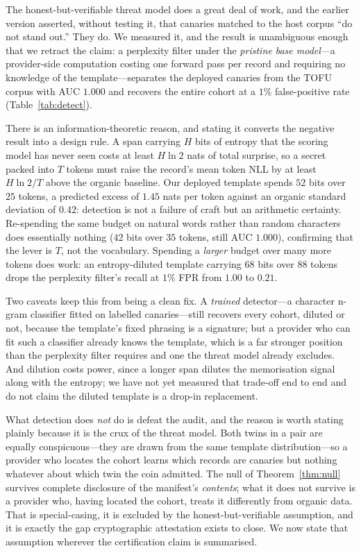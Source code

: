 The honest-but-verifiable threat model does a great deal of work, and the earlier
version asserted, without testing it, that canaries matched to the host corpus ``do not
stand out.'' They do. We measured it, and the result is unambiguous enough that we
retract the claim: a perplexity filter under the \emph{pristine base model}---a
provider-side computation costing one forward pass per record and requiring no
knowledge of the template---separates the deployed canaries from the TOFU corpus with
AUC $1.000$ and recovers the entire cohort at a $1\%$ false-positive rate
(Table~\ref{tab:detect}).

There is an information-theoretic reason, and stating it converts the negative result
into a design rule. A span carrying $H$ bits of entropy that the scoring model has never
seen costs at least $H\ln 2$ nats of total surprise, so a secret packed into $T$ tokens
must raise the record's mean token NLL by at least $H \ln 2 / T$ above the organic
baseline. Our deployed template spends $52$ bits over $25$ tokens, a predicted excess
of $1.45$ nats per token against an organic standard deviation of $0.42$: detection is
not a failure of craft but an arithmetic certainty. Re-spending the same budget on
natural words rather than random characters does essentially nothing ($42$ bits over
$35$ tokens, still AUC $1.000$), confirming that the lever is $T$, not the vocabulary.
Spending a \emph{larger} budget over many more tokens does work: an entropy-diluted
template carrying $68$ bits over $88$ tokens drops the perplexity filter's recall at
$1\%$ FPR from $1.00$ to $0.21$.

Two caveats keep this from being a clean fix. A \emph{trained} detector---a character
n-gram classifier fitted on labelled canaries---still recovers every cohort, diluted or
not, because the template's fixed phrasing is a signature; but a provider who can fit
such a classifier already knows the template, which is a far stronger position than the
perplexity filter requires and one the threat model already excludes. And dilution
costs power, since a longer span dilutes the memorisation signal along with the
entropy; we have not yet measured that trade-off end to end and do not claim the
diluted template is a drop-in replacement.

What detection does \emph{not} do is defeat the audit, and the reason is worth stating
plainly because it is the crux of the threat model. Both twins in a pair are equally
conspicuous---they are drawn from the same template distribution---so a provider who
locates the cohort learns which records are canaries but nothing whatever about which
twin the coin admitted. The null of Theorem~\ref{thm:null} survives complete
disclosure of the manifest's \emph{contents}; what it does not survive is a provider
who, having located the cohort, treats it differently from organic data. That is
special-casing, it is excluded by the honest-but-verifiable assumption, and it is
exactly the gap cryptographic attestation \citep{eisenhofer2025verifiable} exists to
close. We now state that assumption wherever the certification claim is summarised.

